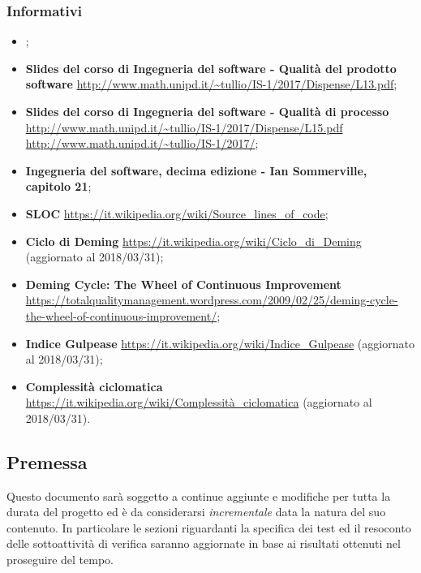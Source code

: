 \subsubsection{Informativi}
\begin{itemize}
	\item
	\textbf{\PdP{}};
	\item
	\textbf{Slides del corso di Ingegneria del software - Qualità del prodotto software}
	\url{http://www.math.unipd.it/~tullio/IS-1/2017/Dispense/L13.pdf};
	\item
	\textbf{Slides del corso di Ingegneria del software - Qualità di processo}
	\url{http://www.math.unipd.it/~tullio/IS-1/2017/Dispense/L15.pdf}
	\url{http://www.math.unipd.it/~tullio/IS-1/2017/};
	\item 
	\textbf{Ingegneria del software, decima edizione - Ian Sommerville, capitolo 21};
	\item
	\textbf{SLOC}
	\url{https://it.wikipedia.org/wiki/Source_lines_of_code};
	\item
	\textbf{Ciclo di Deming}
	\url{https://it.wikipedia.org/wiki/Ciclo_di_Deming} (aggiornato al 2018/03/31);
	\item
	\textbf{Deming Cycle: The Wheel of Continuous Improvement}
	\url{https://totalqualitymanagement.wordpress.com/2009/02/25/deming-cycle-the-wheel-of-continuous-improvement/};
	\item
	\textbf{Indice Gulpease}
	\url{https://it.wikipedia.org/wiki/Indice_Gulpease} (aggiornato al 2018/03/31);
	\item
	\textbf{Complessità ciclomatica}
	\url{https://it.wikipedia.org/wiki/Complessità_ciclomatica} (aggiornato al 2018/03/31).
	
\end{itemize}

\subsection{Premessa}
Questo documento sarà soggetto a continue aggiunte e modifiche per tutta la durata del progetto ed è da considerarsi \textit{incrementale} data la natura del suo contenuto. In particolare le sezioni riguardanti la specifica dei test ed il resoconto delle sottoattività di verifica saranno aggiornate in base ai risultati ottenuti nel proseguire del tempo.
